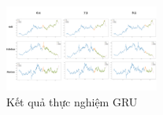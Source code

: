 \begin{figure}[H]
\centerline{\includegraphics[width=0.45\textwidth]{img/GRU_result.png}}
\caption{Kết quả thực nghiệm GRU}
\label{fig}
\end{figure}